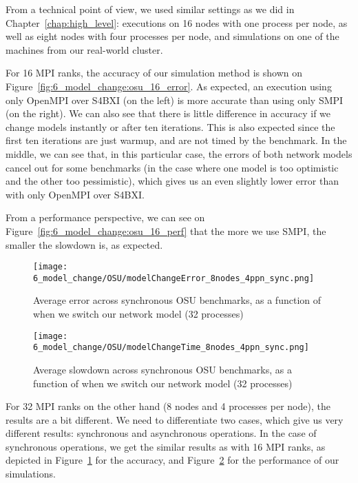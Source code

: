 From a technical point of view, we used similar settings as we did in
Chapter~\ref{chap:high_level}: executions on 16 nodes with one process per node,
as well as eight nodes with four processes per node, and simulations on one of
the machines from our real-world cluster.

For 16 MPI ranks, the accuracy of our simulation method is shown on
Figure~\ref{fig:6_model_change:osu_16_error}. As expected, an execution using
only OpenMPI over S4BXI (on the left) is more accurate than using only SMPI (on
the right). We can also see that there is little difference in accuracy if we
change models instantly or after ten iterations. This is also expected since the
first ten iterations are just warmup, and are not timed by the benchmark. In the
middle, we can see that, in this particular case,  the errors of both network
models cancel out for some benchmarks (in the case where one model is too
optimistic and the other too pessimistic), which gives us an even slightly lower
error than with only OpenMPI over S4BXI.

From a performance perspective, we can see on
Figure~\ref{fig:6_model_change:osu_16_perf} that the more we use SMPI, the
smaller the slowdown is, as expected.

\begin{figure}[!h]
    \centering
    \texttt{[image: 6\_model\_change/OSU/modelChangeError\_8nodes\_4ppn\_sync.png]}
    \caption{Average error across synchronous OSU benchmarks, as a function of when we switch our network model (32 processes)}
    \label{fig:6_model_change:osu_32_sync_error}
\end{figure}

\begin{figure}[!h]
    \centering
    \texttt{[image: 6\_model\_change/OSU/modelChangeTime\_8nodes\_4ppn\_sync.png]}
    \caption{Average slowdown across synchronous OSU benchmarks, as a function of when we switch our network model (32 processes)}
    \label{fig:6_model_change:osu_32_sync_perf}
\end{figure}

For 32 MPI ranks on the other hand (8 nodes and 4 processes per node), the
results are a bit different. We need to differentiate two cases, which give us
very different results: synchronous and asynchronous operations. In the case of
synchronous operations, we get the similar results as with 16 MPI ranks, as
depicted in Figure~\ref{fig:6_model_change:osu_32_sync_error} for the accuracy,
and Figure~\ref{fig:6_model_change:osu_32_sync_perf} for the performance of our
simulations.

